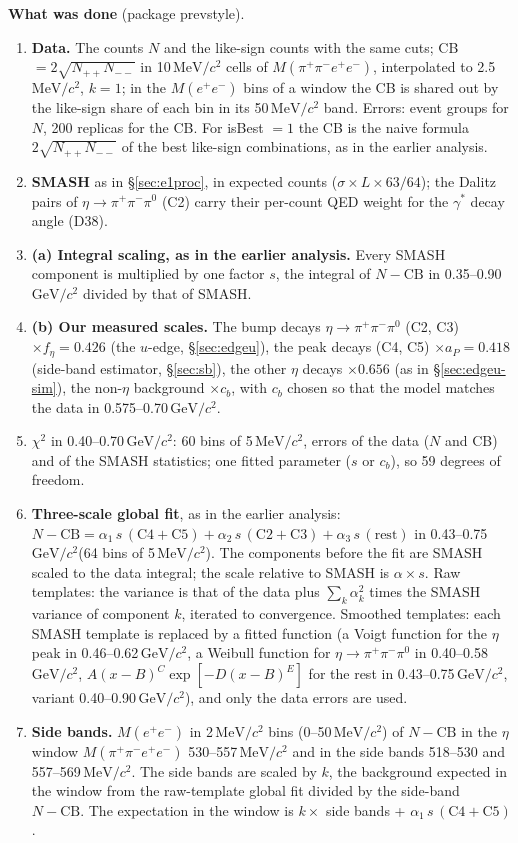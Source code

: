 \documentclass[11pt,a4paper]{article}
\newcommand{\piz}{\ensuremath{\pi^{0}}\xspace}
\newcommand{\pipi}{\ensuremath{\pi^{+}\pi^{-}}\xspace}
\newcommand{\Mfour}{\ensuremath{M(\pi^{+}\pi^{-}e^{+}e^{-})}\xspace}
\newcommand{\Mee}{\ensuremath{M(e^{+}e^{-})}\xspace}
\newcommand{\GeVcc}{\ensuremath{\mathrm{GeV}/c^{2}}\xspace}
\newcommand{\MeVcc}{\ensuremath{\mathrm{MeV}/c^{2}}\xspace}
\newcommand{\aP}{\ensuremath{a_P}\xspace}
\newcommand{\feta}{\ensuremath{f_\eta}\xspace}
\begin{document}
\textbf{What was done} (package prevstyle).
\begin{enumerate}\setlength{\itemsep}{1pt}
\item \textbf{Data.} The counts $N$ and the like-sign counts with the same cuts; CB $=2\sqrt{N_{++}N_{--}}$ in 10\,\MeVcc cells of \Mfour,
      interpolated to 2.5\,\MeVcc, $k=1$; in the \Mee bins of a window the CB is shared out by the like-sign share of each bin in its 50\,\MeVcc
      band. Errors: event groups for $N$, 200 replicas for the CB. For isBest $=1$ the CB is the naive formula $2\sqrt{N_{++}N_{--}}$ of the best
      like-sign combinations, as in the earlier analysis.
\item \textbf{SMASH} as in \S\ref{sec:e1proc}, in expected counts ($\sigma\times L\times63/64$); the Dalitz pairs of $\eta\to\pipi\piz$ (C2)
      carry their per-count QED weight for the $\gamma^*$ decay angle (D38).
\item \textbf{(a) Integral scaling, as in the earlier analysis.} Every SMASH component is multiplied by one factor $s$, the integral of
      $N-\mathrm{CB}$ in 0.35--0.90\,\GeVcc divided by that of SMASH.
\item \textbf{(b) Our measured scales.} The bump decays $\eta\to\pipi\piz$ (C2, C3) $\times\feta=0.426$ (the $u$-edge, \S\ref{sec:edgeu}), the
      peak decays (C4, C5) $\times\aP=0.418$ (side-band estimator, \S\ref{sec:sb}), the other $\eta$ decays $\times0.656$ (as in
      \S\ref{sec:edgeu-sim}), the non-$\eta$ background $\times c_b$, with $c_b$ chosen so that the model matches the data in
      0.575--0.70\,\GeVcc.
\item \textbf{$\chi^2$} in 0.40--0.70\,\GeVcc: 60 bins of 5\,\MeVcc, errors of the data ($N$ and CB) and of the SMASH statistics; one fitted
      parameter ($s$ or $c_b$), so 59 degrees of freedom.
\item \textbf{Three-scale global fit}, as in the earlier analysis: $N-\mathrm{CB}=\alpha_1\,s\,(\mathrm{C4}+\mathrm{C5})+\alpha_2\,s\,(\mathrm{C2}+\mathrm{C3})
      +\alpha_3\,s\,(\mathrm{rest})$ in 0.43--0.75\,\GeVcc (64 bins of 5\,\MeVcc). The components before the fit are SMASH scaled to the data
      integral; the scale relative to SMASH is $\alpha\times s$. Raw templates: the variance is that of the data plus $\sum_k\alpha_k^2$ times
      the SMASH variance of component $k$, iterated to convergence. Smoothed templates: each SMASH template is replaced by a fitted function (a
      Voigt function for the $\eta$ peak in 0.46--0.62\,\GeVcc, a Weibull function for $\eta\to\pipi\piz$ in 0.40--0.58\,\GeVcc,
      $A(x-B)^C\exp[-D(x-B)^E]$ for the rest in 0.43--0.75\,\GeVcc, variant 0.40--0.90\,\GeVcc), and only the data errors are used.
\item \textbf{Side bands.} \Mee in 2\,\MeVcc bins (0--50\,\MeVcc) of $N-\mathrm{CB}$ in the $\eta$ window \Mfour 530--557\,\MeVcc and in the
      side bands 518--530 and 557--569\,\MeVcc. The side bands are scaled by $k$, the background expected in the window from the raw-template global
      fit divided by the side-band $N-\mathrm{CB}$. The expectation in the window is $k\times$ side bands + $\alpha_1\,s\,(\mathrm{C4}+\mathrm{C5})$.
\end{enumerate}
\end{document}
